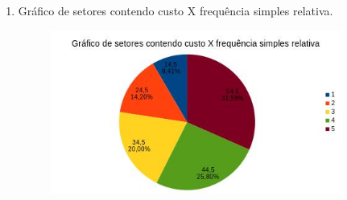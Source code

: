 \documentclass[a4paper, 12pt]{article}
\begin{document}
\begin{enumerate}
\begin{enumerate}
\newpage
   
 \item Gráfico de setores contendo custo X frequência simples relativa.
   \begin{figure}[h!]
   \centering
   \includegraphics[width=0.9\textwidth]{6}
   \end{figure} \\
   
\end{enumerate}    
\end{enumerate}  
\end{document}
